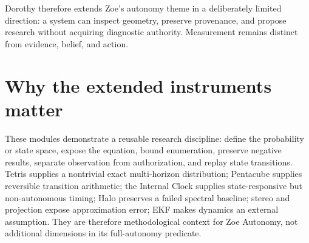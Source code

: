 Dorothy therefore extends Zoe's autonomy theme in a deliberately limited direction: a system can inspect geometry, preserve provenance, and propose research without acquiring diagnostic authority. Measurement remains distinct from evidence, belief, and action.

\section{Why the extended instruments matter}
These modules demonstrate a reusable research discipline: define the probability or state space, expose the equation, bound enumeration, preserve negative results, separate observation from authorization, and replay state transitions. Tetris supplies a nontrivial exact multi-horizon distribution; Pentacube supplies reversible transition arithmetic; the Internal Clock supplies state-responsive but non-autonomous timing; Halo preserves a failed spectral baseline; stereo and projection expose approximation error; EKF makes dynamics an external assumption. They are therefore methodological context for Zoe Autonomy, not additional dimensions in its full-autonomy predicate.
